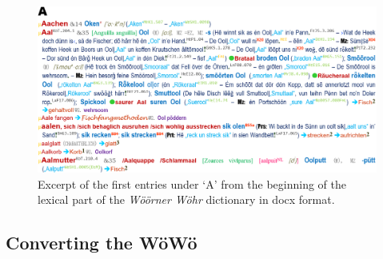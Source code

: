     
\begin{figure}
    \centering
    \includegraphics[width=0.9\linewidth]{img/woewoe_excerpt-hires.png}
    \caption{Excerpt of the first entries under ‘A’ from the beginning of the lexical part of the \emph{Wöörner Wöhr} dictionary in docx format.}
    \label{fig-woewoe-excerpt}
\end{figure}

\subsection{Converting the WöWö}

